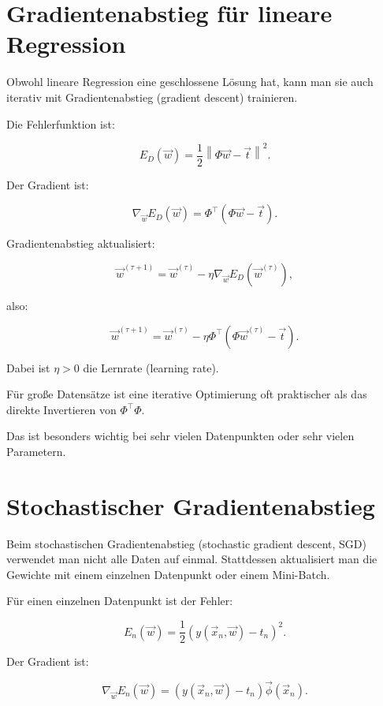 \section{Gradientenabstieg für lineare Regression}

Obwohl lineare Regression eine geschlossene Lösung hat, kann man sie auch iterativ mit Gradientenabstieg (gradient descent) trainieren.

Die Fehlerfunktion ist:

\[
    E_D(\vec{w})
    =
    \frac{1}{2}
    \left\|
        \Phi\vec{w}-\vec{t}
    \right\|^2.
\]

Der Gradient ist:

\[
    \nabla_{\vec{w}}E_D(\vec{w})
    =
    \Phi^{\top}
    (
        \Phi\vec{w}-\vec{t}
    ).
\]

Gradientenabstieg aktualisiert:

\[
    \vec{w}^{(\tau+1)}
    =
    \vec{w}^{(\tau)}
    -
    \eta
    \nabla_{\vec{w}}E_D(\vec{w}^{(\tau)}),
\]

also:

\[
    \vec{w}^{(\tau+1)}
    =
    \vec{w}^{(\tau)}
    -
    \eta
    \Phi^{\top}
    (
        \Phi\vec{w}^{(\tau)}-\vec{t}
    ).
\]

Dabei ist \(\eta>0\) die Lernrate (learning rate).

\begin{notebox}
Für große Datensätze ist eine iterative Optimierung oft praktischer als das direkte Invertieren von \(\Phi^{\top}\Phi\).

Das ist besonders wichtig bei sehr vielen Datenpunkten oder sehr vielen Parametern.
\end{notebox}

\section{Stochastischer Gradientenabstieg}

Beim stochastischen Gradientenabstieg (stochastic gradient descent, SGD) verwendet man nicht alle Daten auf einmal.
Stattdessen aktualisiert man die Gewichte mit einem einzelnen Datenpunkt oder einem Mini-Batch.

Für einen einzelnen Datenpunkt ist der Fehler:

\[
    E_n(\vec{w})
    =
    \frac{1}{2}
    \left(
        y(\vec{x}_n,\vec{w})-t_n
    \right)^2.
\]

Der Gradient ist:

\[
    \nabla_{\vec{w}}E_n(\vec{w})
    =
    \left(
        y(\vec{x}_n,\vec{w})-t_n
    \right)
    \vec{\phi}(\vec{x}_n).
\]

